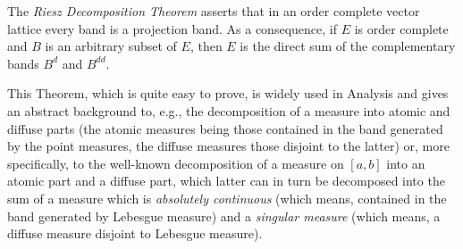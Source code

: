 The \emph{Riesz Decomposition Theorem} asserts that in an order complete vector lattice every band is a projection band.
As a consequence, if $ E $ is order complete and $ B $ is an arbitrary subset of $ E $, then $ E $ is the direct sum of the complementary bands $ B^{d} $ and $ B^{dd} $.

This Theorem, which is quite easy to prove, is widely used in Analysis and gives an abstract background to, e.g., the decomposition of a measure into atomic and diffuse parts (the atomic measures being those contained in the band generated by the point measures, the diffuse measures those disjoint to the latter) or, more specifically, to the well-known decomposition of a measure on $ [a,b] $ into an atomic part and a diffuse part, which latter can in turn be decomposed into the sum of a measure which is \emph{absolutely continuous} (which means, contained in the band generated by Lebesgue measure) and a \emph{singular measure} (which means, a diffuse measure disjoint to Lebesgue measure).


\pagebreak





\pagebreak




\pagebreak





\pagebreak





\pagebreak






\pagebreak





\pagebreak






\pagebreak






\pagebreak






\pagebreak
